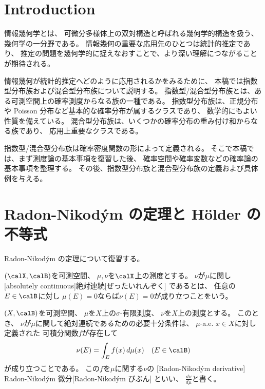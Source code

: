\documentclass[report]{jlreq}
\begin{document}
%

%
\section{Introduction}

情報幾何学とは、
可微分多様体上の双対構造と呼ばれる幾何学的構造を扱う、
幾何学の一分野である。
情報幾何の重要な応用先のひとつは統計的推定であり、
推定の問題を幾何学的に捉えなおすことで、より深い理解につながることが期待される。

情報幾何が統計的推定へどのように応用されるかをみるために、
本稿では指数型分布族および混合型分布族について説明する。
指数型/混合型分布族とは、ある可測空間上の確率測度からなる族の一種である。
指数型分布族は、正規分布や Poisson 分布など基本的な確率分布が属するクラスであり、
数学的にもよい性質を備えている。
混合型分布族は、いくつかの確率分布の重み付け和からなる族であり、
応用上重要なクラスである。

指数型/混合型分布族は確率密度関数の形によって定義される。
そこで本稿では、まず測度論の基本事項を復習した後、
確率空間や確率変数などの確率論の基本事項を整理する。
その後、指数型分布族と混合型分布族の定義および具体例を与える。

%
\section{Radon-Nikod\'ym の定理と H\"older の不等式}

Radon-Nikod\'ym の定理について復習する。

\begin{definition}[絶対連続]
    $(\calX, \calB)$を可測空間、
    $\mu, \nu$を$\calX$上の測度とする。
    $\nu$が$\mu$に関し
    [absolutely continuous]{絶対連続}[ぜったいれんぞく]
    であるとは、
    任意の$E \in \calB$に対し
    $\mu(E) = 0$ならば$\nu(E) = 0$が成り立つことをいう。
\end{definition}

\begin{theorem}
    $(X, \calB)$を可測空間、
    $\mu$を$X$上の$\sigma$-有限測度、
    $\nu$を$X$上の測度とする。
    このとき、
    $\nu$が$\mu$に関して絶対連続であるための必要十分条件は、
    $\mu$-a.e. $x \in X$に対し定義された
    可積分関数$f$が存在して
    \begin{equation}
        \nu(E) = \int_E f(x) \, d\mu(x)
            \quad
            (E \in \calB)
    \end{equation}
    が成り立つことである。
    この$f$を$\mu$に関する$\nu$の
    [Radon-Nikod\'ym derivative]
        {Radon-Nikod\'ym 微分}[Radon-Nikod\'ym びぶん]
    といい、
    $\frac{d\nu}{d\mu}$と書く。
\end{theorem}
\end{document}
